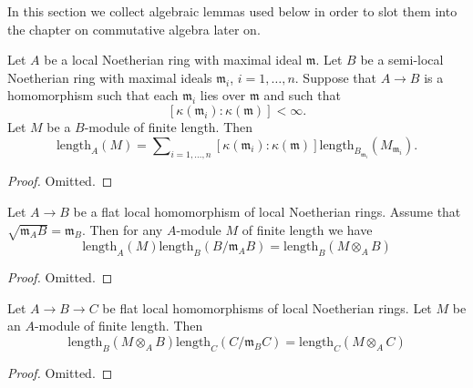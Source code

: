\noindent
In this section we collect algebraic lemmas used below in order to
slot them into the chapter on commutative algebra later on.

\begin{lemma}
\label{lemma-pushdown-module}
Let $A$ be a local Noetherian ring with maximal ideal $\mathfrak m$.
Let $B$ be a semi-local Noetherian ring with maximal ideals $\mathfrak m_i$,
$i = 1, \ldots, n$.
Suppose that $A \to B$ is a homomorphism such that each $\mathfrak m_i$
lies over $\mathfrak m$ and such that
$$
[\kappa(\mathfrak m_i) : \kappa(\mathfrak m)] < \infty.
$$
Let $M$ be a $B$-module of finite length.
Then
$$
\text{length}_A(M) = \sum\nolimits_{i = 1, \ldots, n}
[\kappa(\mathfrak m_i) : \kappa(\mathfrak m)]
\text{length}_{B_{\mathfrak m_i}}(M_{\mathfrak m_i}).
$$
\end{lemma}

\begin{proof}
Omitted.
\end{proof}

\begin{lemma}
\label{lemma-pullback-module}
Let $A \to B$ be a flat local homomorphism of local Noetherian rings.
Assume that $\sqrt{\mathfrak m_A B} = \mathfrak m_B$.
Then for any $A$-module $M$ of finite length we have
$$
\text{length}_A(M) \text{length}_B(B/\mathfrak m_AB)
=
\text{length}_B(M \otimes_A B)
$$
\end{lemma}

\begin{proof}
Omitted.
\end{proof}

\begin{lemma}
\label{lemma-pullback-transitive}
Let $A \to B \to C$ be flat local homomorphisms of local Noetherian rings.
Let $M$ be an $A$-module of finite length.
Then
$$
\text{length}_B(M \otimes_A B) \text{length}_C(C/\mathfrak m_B C)
=
\text{length}_C(M \otimes_A C)
$$
\end{lemma}

\begin{proof}
Omitted.
\end{proof}


